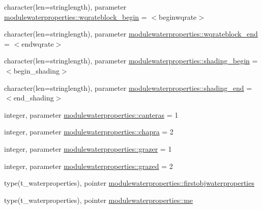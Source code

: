 \begin{DoxyCompactItemize}
\item 
character(len=stringlength), parameter \mbox{\hyperlink{namespacemodulewaterproperties_afcb8158a31eb190cd761c4a78545fd9f}{modulewaterproperties\+::wqrateblock\+\_\+begin}} = \textquotesingle{}$<$beginwqrate$>$\textquotesingle{}
\item 
character(len=stringlength), parameter \mbox{\hyperlink{namespacemodulewaterproperties_a475ba576901500320a60416bf37b02af}{modulewaterproperties\+::wqrateblock\+\_\+end}} = \textquotesingle{}$<$endwqrate$>$\textquotesingle{}
\item 
character(len=stringlength), parameter \mbox{\hyperlink{namespacemodulewaterproperties_a51f1162211d338123e9ca464f61b794f}{modulewaterproperties\+::shading\+\_\+begin}} = \textquotesingle{}$<$begin\+\_\+shading$>$\textquotesingle{}
\item 
character(len=stringlength), parameter \mbox{\hyperlink{namespacemodulewaterproperties_acc1f3c2ffa2d7ca6898633c3278f42f9}{modulewaterproperties\+::shading\+\_\+end}} = \textquotesingle{}$<$end\+\_\+shading$>$\textquotesingle{}
\item 
integer, parameter \mbox{\hyperlink{namespacemodulewaterproperties_a3d943ea9e379be00013c408258074a74}{modulewaterproperties\+::canteras}} = 1
\item 
integer, parameter \mbox{\hyperlink{namespacemodulewaterproperties_a45723a4d6bb04441fb778f26465d7fcc}{modulewaterproperties\+::chapra}} = 2
\item 
integer, parameter \mbox{\hyperlink{namespacemodulewaterproperties_a3e35da380ab86aa705245e6d2a397bac}{modulewaterproperties\+::grazer}} = 1
\item 
integer, parameter \mbox{\hyperlink{namespacemodulewaterproperties_ac58d0aa9a8e828393a35fe78e9a20048}{modulewaterproperties\+::grazed}} = 2
\item 
type(t\+\_\+waterproperties), pointer \mbox{\hyperlink{namespacemodulewaterproperties_a30f53fbac0d69722990af045f9fba578}{modulewaterproperties\+::firstobjwaterproperties}}
\item 
type(t\+\_\+waterproperties), pointer \mbox{\hyperlink{namespacemodulewaterproperties_abe019d24d7f8e105550a835095609fdb}{modulewaterproperties\+::me}}
\end{DoxyCompactItemize}
